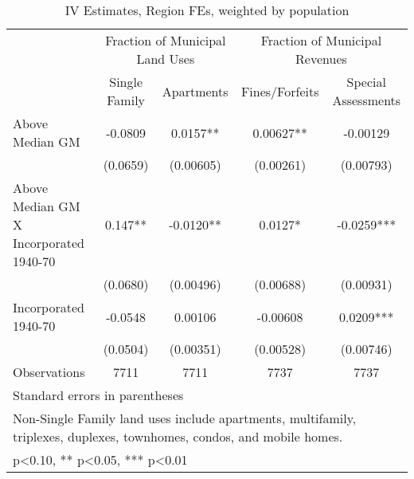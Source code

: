 \begin{table}[htbp]\centering
\def\sym#1{\ifmmode^{#1}\else\(^{#1}\)\fi}
\caption{IV Estimates, Region FEs, weighted by population}
\begin{tabular}{l*{4}{c}}
\toprule
                    &\multicolumn{2}{c}{Fraction of Municipal Land Uses}&\multicolumn{2}{c}{Fraction of Municipal Revenues}\\\cmidrule(lr){2-3}\cmidrule(lr){4-5}
                    &\multicolumn{1}{c}{Single Family}&\multicolumn{1}{c}{Apartments}&\multicolumn{1}{c}{Fines/Forfeits}&\multicolumn{1}{c}{Special Assessments}\\
\midrule
Above Median GM     &     -0.0809   &      0.0157** &     0.00627** &    -0.00129   \\
                    &    (0.0659)   &   (0.00605)   &   (0.00261)   &   (0.00793)   \\
\addlinespace
Above Median GM X Incorporated 1940-70&       0.147** &     -0.0120** &      0.0127*  &     -0.0259***\\
                    &    (0.0680)   &   (0.00496)   &   (0.00688)   &   (0.00931)   \\
\addlinespace
Incorporated 1940-70&     -0.0548   &     0.00106   &    -0.00608   &      0.0209***\\
                    &    (0.0504)   &   (0.00351)   &   (0.00528)   &   (0.00746)   \\
\midrule
Observations        &        7711   &        7711   &        7737   &        7737   \\
\bottomrule
\multicolumn{5}{l}{\footnotesize Standard errors in parentheses}\\
\multicolumn{5}{l}{\footnotesize Non-Single Family land uses include apartments, multifamily, triplexes, duplexes, townhomes, condos, and mobile homes.}\\
\multicolumn{5}{l}{\footnotesize * p<0.10, ** p<0.05, *** p<0.01}\\
\end{tabular}
\end{table}
